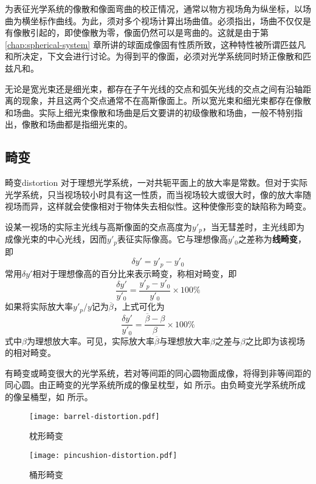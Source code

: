 为表征光学系统的像散和像面弯曲的校正情况，通常以物方视场角为纵坐标，以场曲为横坐标作曲线。为此，须对多个视场计算出场曲值。必须指出，场曲不仅仅是有像散引起的，即使像散为零，像面仍然可以是弯曲的。这就是由于第 \ref{chap:spherical-system} 章所讲的球面成像固有性质所致，这种特性被所谓匹兹凡和所决定，下文会进行讨论。为得到平的像面，必须对光学系统同时矫正像散和匹兹凡和。

无论是宽光束还是细光束，都存在子午光线的交点和弧矢光线的交点之间有沿轴距离的现象，并且这两个交点通常不在高斯像面上。所以宽光束和细光束都存在像散和场曲。实际上细光束像散和场曲是后文要讲的初级像散和场曲，一般不特别指出，像散和场曲都是指细光束的。

\subsection{畸变}
\label{subsect:distortion}
\begin{definition}{畸变}{distortion}
	对于理想光学系统，一对共轭平面上的放大率是常数。但对于实际光学系统，只当视场较小时具有这一性质，而当视场较大或很大时，像的放大率随视场而异，这样就会使像相对于物体失去相似性。这种使像形变的缺陷称为畸变。
\end{definition}

设某一视场的实际主光线与高斯像面的交点高度为$y'_p$，当无彗差时，主光线即为成像光束的中心光线，因而$y'_p$表征实际像高。它与理想像高$y'_0$之差称为\textbf{线畸变}，即
\begin{equation}
\delta y'=y'_p-y'_0
\end{equation}
常用$\delta y'$相对于理想像高的百分比来表示畸变，称相对畸变，即
\begin{equation}
\frac{\delta y'}{y'_0}=\frac{y'_p-y'_0}{y'_0}\times100\%
\end{equation}
如果将实际放大率$y'_p/y$记为$\overline{\beta}$，上式可化为
\begin{equation}
\frac{\delta y'}{y'_0}=\frac{\overline{\beta}-\beta}{\beta}\times100\%
\end{equation}
式中$\beta$为理想放大率。可见，实际放大率$\overline{\beta}$与理想放大率$\beta$之差与$\beta$之比即为该视场的相对畸变。

有畸变或畸变很大的光学系统，若对等间距的同心圆物面成像，将得到非等间距的同心圆。由正畸变的光学系统所成的像呈枕型，如  所示。由负畸变光学系统所成的像呈桶型，如  所示。

\begin{figure}[htbp]
	\centering
	\begin{minipage}[t]{0.45\textwidth}
		\centering
		\texttt{[image: barrel-distortion.pdf]}
		\caption{枕形畸变}
		\label{fig:barrel-distortion}
	\end{minipage}
	\quad
	\begin{minipage}[t]{0.45\textwidth}
		\centering
		\texttt{[image: pincushion-distortion.pdf]}
		\caption{桶形畸变}
		\label{fig:pincushion-distortion}
	\end{minipage}
\end{figure}

